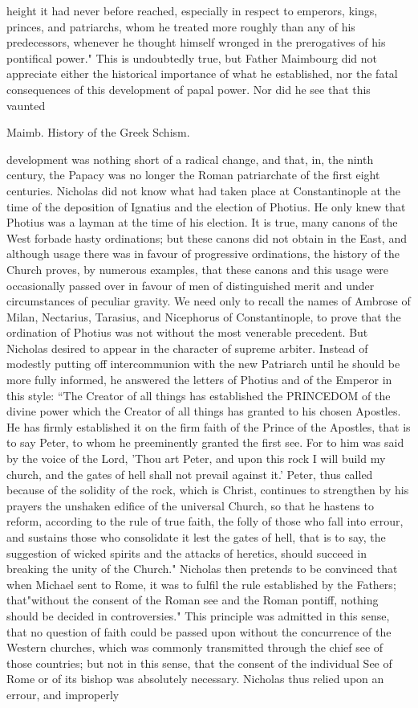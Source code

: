 height it had never before reached, especially in respect to emperors, kings, princes, and patriarchs, whom he treated more roughly than any of his predecessors, whenever he thought himself wronged in the prerogatives of his pontifical power." This is undoubtedly true, but Father Maimbourg did not appreciate either the historical importance of what he established, nor the fatal consequences of this development of papal power. Nor did he see that this vaunted

Maimb. History of the Greek Schism.

development was nothing short of a radical change, and that, in, the ninth century, the Papacy was no longer the Roman patriarchate of the first eight centuries. Nicholas did not know what had taken place at Constantinople at the time of the deposition of Ignatius and the election of Photius. He only knew that Photius was a layman at the time of his election. It is true, many canons of the West forbade hasty ordinations; but these canons did not obtain in the East, and although usage there was in favour of progressive ordinations, the history of the Church proves, by numerous examples, that these canons and this usage were occasionally passed over in favour of men of distinguished merit and under circumstances of peculiar gravity. We need only to recall the names of Ambrose of Milan, Nectarius, Tarasius, and Nicephorus of Constantinople, to prove that the ordination of Photius was not without the most venerable precedent. But Nicholas desired to appear in the character of supreme arbiter. Instead of modestly putting off intercommunion with the new Patriarch until he should be more fully informed, he answered the letters of Photius and of the Emperor in this style: “The Creator of all things has established the PRINCEDOM of the divine power which the Creator of all things has granted to his chosen Apostles. He has firmly established it on the firm faith of the Prince of the Apostles, that is to say Peter, to whom he preeminently granted the first see. For to him was said by the voice of the Lord, 'Thou art Peter, and upon this rock I will build my church, and the gates of hell shall not prevail against it.' Peter, thus called because of the solidity of the rock, which is Christ, continues to strengthen by his prayers the unshaken edifice of the universal Church, so that he hastens to reform, according to the rule of true faith, the folly of those who fall into errour, and sustains those who consolidate it lest the gates of hell, that is to say, the suggestion of wicked spirits and the attacks of heretics, should succeed in breaking the unity of the Church." Nicholas then pretends to be convinced that when Michael sent to Rome, it was to fulfil the rule established by the Fathers; that"without the consent of the Roman see and the Roman pontiff, nothing should be decided in controversies." This principle was admitted in this sense, that no question of faith could be passed upon without the concurrence of the Western churches, which was commonly transmitted through the chief see of those countries; but not in this sense, that the consent of the individual See of Rome or of its bishop was absolutely necessary. Nicholas thus relied upon an errour, and improperly 